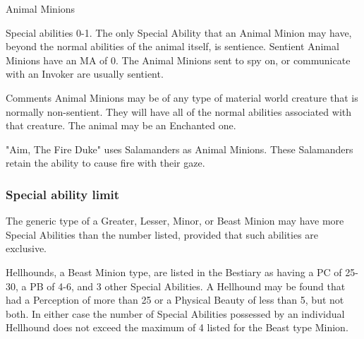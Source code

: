 \begin{Description}
\item[Animal Minions]
\begin{Description}
\item[Special abilities] 0-1.  The only Special Ability that an Animal Minion may have, beyond the normal abilities of the animal itself, is sentience. Sentient Animal Minions have an MA of 0. The Animal Minions sent to spy on, or communicate with an Invoker are usually sentient.
\item[Comments] Animal Minions may be of any type of material world creature that is normally non-sentient. They will have all of the normal abilities associated with that creature.  The animal may be an Enchanted one.  
\end{Description}
\end{Description}
\begin{example}
"Aim, The Fire Duke" uses Salamanders as Animal Minions.  These Salamanders retain the ability to cause fire with their gaze.
\end{example}

\subsubsection{Special ability limit}

The generic type of a Greater, Lesser, Minor, or Beast Minion may have
more Special Abilities than the number listed, provided that such
abilities are exclusive.

\begin{example}
Hellhounds, a Beast Minion type, are listed in the Bestiary as
having a PC of 25-30, a PB of 4-6, and 3 other Special Abilities.  A
Hellhound may be found that had a Perception of more than 25 or a
Physical Beauty of less than 5, but not both.  In either case the
number of Special Abilities possessed by an individual Hellhound does
not exceed the maximum of 4 listed for the Beast type Minion.
\end{example}
